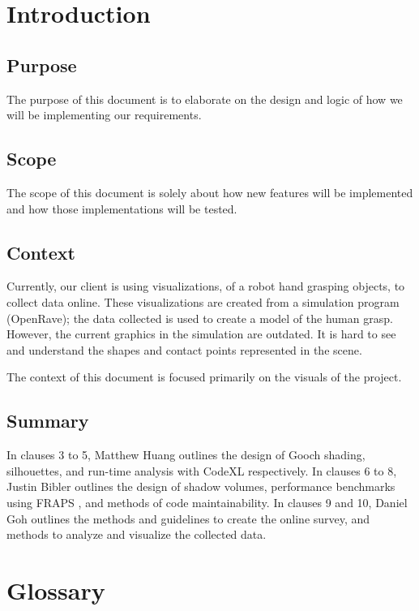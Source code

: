 \documentclass[10pt,journal,compsoc,draftclsnofoot]{IEEEtran}
\begin{document}
\section{Introduction}
\begin{flushleft}

\subsection{Purpose}
The purpose of this document is to elaborate on the design and logic of how we will be implementing our requirements.

\subsection{Scope}
The scope of this document is solely about how new features will be implemented and how those implementations will be tested.

\subsection{Context}
Currently, our client is using visualizations, of a robot hand grasping objects, to collect data online.
These visualizations are created from a simulation program (OpenRave); the data collected is used to create a model of the human grasp.
However, the current graphics in the simulation are outdated.
It is hard to see and understand the shapes and contact points represented in the scene.

The context of this document is focused primarily on the visuals of the project.

\subsection{Summary}
In clauses 3 to 5, Matthew Huang outlines the design of Gooch shading, silhouettes, and run-time analysis with CodeXL respectively.
In clauses 6 to 8, Justin Bibler outlines the design of shadow volumes, performance benchmarks using FRAPS \cite{fraps}, and methods of code maintainability.
In clauses 9 and 10, Daniel Goh outlines the methods and guidelines to create the online survey, and methods to analyze and visualize the collected data.

\newpage




\section{Glossary}


\end{flushleft}
\end{document}
